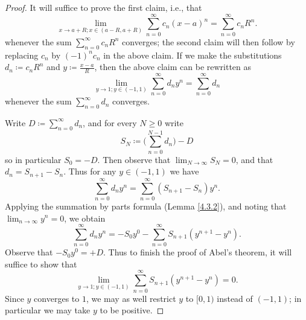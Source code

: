 \begin{proof}
    It will suffice to prove the first claim, i.e., that
    \[
        \lim_{x \to a + R ; x \in (a - R, a + R)} \sum_{n = 0}^\infty c_n (x - a)^n = \sum_{n = 0}^\infty c_n R^n.
    \]
    whenever the sum \(\sum_{n = 0}^\infty c_n R^n\) converges;
    the second claim will then follow by replacing \(c_n\) by \((-1)^n c_n\) in the above claim.
    If we make the substitutions \(d_n \coloneqq c_n R^n\) and \(y \coloneqq \frac{x - a}{R}\), then the above claim can be rewritten as
    \[
        \lim_{y \to 1 ; y \in (-1, 1)} \sum_{n = 0}^\infty d_n y^n = \sum_{n = 0}^\infty d_n
    \]
    whenever the sum \(\sum_{n = 0}^\infty d_n\) converges.

    Write \(D \coloneqq \sum_{n = 0}^\infty d_n\), and for every \(N \geq 0\) write
    \[
        S_N \coloneqq \bigg(\sum_{n = 0}^{N - 1} d_n\bigg) - D
    \]
    so in particular \(S_0 = -D\).
    Then observe that \(\lim_{N \to \infty} S_N = 0\), and that \(d_n = S_{n + 1} - S_n\).
    Thus for any \(y \in (-1, 1)\) we have
    \[
        \sum_{n = 0}^\infty d_n y^n = \sum_{n = 0}^\infty (S_{n + 1} - S_n) y^n.
    \]
    Applying the summation by parts formula (Lemma \ref{4.3.2}), and noting that \(\lim_{n \to \infty} y^n = 0\), we obtain
    \[
        \sum_{n = 0}^\infty d_n y^n = - S_0 y^0 - \sum_{n = 0}^\infty S_{n + 1} (y^{n + 1} - y^n).
    \]
    Observe that \(- S_0 y^0 = +D\).
    Thus to finish the proof of Abel's theorem,
    it will suffice to show that
    \[
        \lim_{y \to 1 ; y \in (-1, 1)} \sum_{n = 0}^\infty S_{n + 1} (y^{n + 1} - y^n) = 0.
    \]
    Since \(y\) converges to \(1\), we may as well restrict \(y\) to \([0, 1)\) instead of \((-1, 1)\);
    in particular we may take \(y\) to be positive.


\end{proof}
